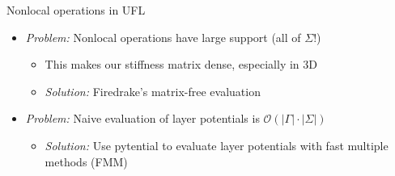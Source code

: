\documentclass{beamer}
\begin{document}
\begin{frame}{Nonlocal operations in UFL}
    \begin{itemize}
        \item<1-> \emph{Problem:} Nonlocal operations have large support (all of
            $\Sigma$!)
        \begin{itemize}
            \item<1-> This makes our stiffness matrix dense, especially
                in 3D
            \item<2-> \emph{Solution:} Firedrake's matrix-free evaluation
        \end{itemize}
        \vfill
        \item<3-> \emph{Problem:} Naive evaluation of layer potentials is 
            $\mathcal O\left(\left|\Gamma\right|\cdot\left|\Sigma\right|\right)$
        \begin{itemize}
            \item<4-> \emph{Solution:} Use pytential to evaluate layer
                potentials with fast multiple methods (FMM) 
        \end{itemize}
    \end{itemize}
\end{frame}
\end{document}

